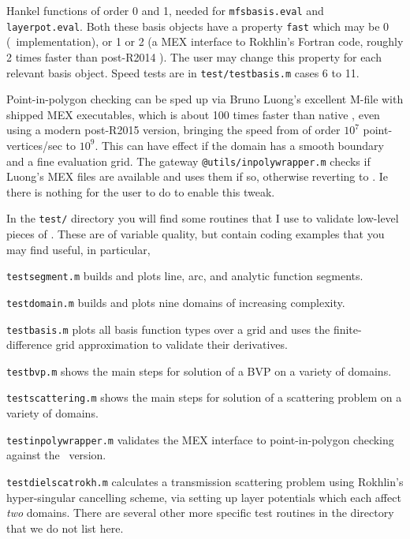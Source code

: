 \documentclass[12pt]{article}
\begin{document}
\item Hankel functions of order 0 and 1, needed for
{\tt mfsbasis.eval} and {\tt layerpot.eval}. Both these basis objects
have a property {\tt fast} which may be 0 (\matlab\ implementation),
or 1 or 2 (a MEX interface to Rokhlin's Fortran code,
roughly 2 times faster than post-R2014 \matlab).
The user may change this property for each relevant basis object.
Speed tests are in {\tt test/testbasis.m} cases 6 to 11.

\item Point-in-polygon checking can be sped up via Bruno Luong's
excellent M-file with shipped MEX executables,
which is about 100 times faster than native
\matlab, even using a modern post-R2015 version,
bringing the speed from of order $10^7$ point-vertices/sec
to $10^9$. This can have effect if the domain has a smooth boundary
and a fine evaluation grid.
The gateway
{\tt @utils/inpolywrapper.m} checks if Luong's MEX files are available
and uses them if so, otherwise reverting to \matlab.
Ie there is nothing for the user to do to enable this tweak.
\een

In the {\tt test/} directory you will find some routines that
I use to validate low-level pieces of \mpspack. These are of variable quality,
but contain coding examples that you may find useful, in particular,
\bi
\item {\tt testsegment.m} builds and plots line, arc, and analytic function
segments.
\item {\tt testdomain.m} builds and plots nine domains of increasing
complexity.
\item {\tt testbasis.m} plots all basis function types over a grid and
uses the finite-difference grid approximation to validate their derivatives.
\item {\tt testbvp.m} shows the main steps for solution of a BVP on
a variety of domains.
\item {\tt testscattering.m} shows the main steps for solution of a 
scattering problem on a variety of domains.
\item {\tt testinpolywrapper.m} validates the MEX interface to point-in-polygon
checking against the \matlab\ version.
\item {\tt testdielscatrokh.m} calculates a transmission scattering problem
using Rokhlin's hyper-singular cancelling scheme, via setting up layer potentials
which each affect {\em two} domains.
\ei
There are several other more specific test routines in the directory
that we do not list here.
\end{document}
